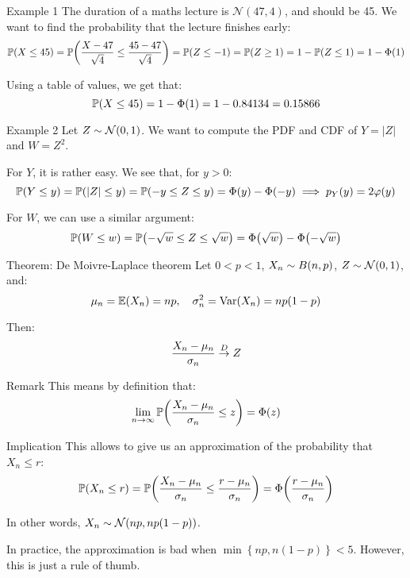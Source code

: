 \documentclass[a4paper]{article}
\begin{document}
\begin{parag}{Example 1}
    The duration of a maths lecture is $\mathcal{N}\left(47, 4\right)$, and should be 45. We want to find the probability that the lecture finishes early: 
    \[\prob\left(X \leq 45\right) = \prob\left(\frac{X - 47}{\sqrt{4}} \leq \frac{45 - 47}{\sqrt{4}}\right) = \prob\left(Z \leq -1\right) = \prob\left(Z \geq 1\right) = 1 - \prob\left(Z \leq 1\right) = 1 - \Phi\left(1\right)\]

    Using a table of values, we get that: 
    \[\prob\left(X \leq 45\right) = 1 - \Phi\left(1\right) = 1 - 0.84134 = 0.15866\]
\end{parag}

\begin{parag}{Example 2}
    Let $Z \followsdistr \mathcal{N}\left(0, 1\right)$. We want to compute the PDF and CDF of $Y = \left|Z\right|$ and $W = Z^2$.

    For $Y$, it is rather easy. We see that, for $y > 0$: 
    \[\prob\left(Y \leq y\right) = \prob\left(\left|Z\right| \leq y\right) = \prob\left(-y \leq Z \leq y \right) = \Phi\left(y\right) - \Phi\left(-y\right) \implies p_Y\left(y\right) = 2 \phi\left(y\right)\]
    
    For $W$, we can use a similar argument: 
    \[\prob\left(W \leq w\right) = \prob\left(-\sqrt{w} \leq Z \leq \sqrt{w}\right) = \Phi\left(\sqrt{w}\right) - \Phi\left(-\sqrt{w}\right)\]
\end{parag}

\begin{parag}{Theorem: De Moivre-Laplace theorem}
    Let $0 < p < 1$, $X_n \followsdistr B\left(n, p\right)$, $Z \followsdistr \mathcal{N}\left(0, 1\right)$, and: 
    \[\mu_n = \exval\left(X_n\right) = np, \mathspace \sigma_n^2 = \Var\left(X_n\right) = np\left(1 - p\right)\]
    
    Then:
    \[\frac{X_n - \mu_n}{\sigma_n} \over{\to}{$D$} Z\]

    \begin{subparag}{Remark}
        This means by definition that:
        \[\lim_{n \to \infty} \prob\left(\frac{X_n - \mu_n}{\sigma_n} \leq z\right) = \Phi\left(z\right)\]
    \end{subparag}

    \begin{subparag}{Implication}
        This allows to give us an approximation of the probability that $X_n \leq r$: 
        \[\prob\left(X_n \leq r\right) = \prob\left(\frac{X_n - \mu_n}{\sigma_n} \leq \frac{r - \mu_n}{\sigma_n}\right) = \Phi\left(\frac{r - \mu_n}{\sigma_n}\right)\]
        
        In other words, $X_n \followsdistr \mathcal{N}\left(np, np\left(1-p\right)\right)$.

        In practice, the approximation is bad when $\min\left\{np, n\left(1-p\right)\right\} < 5$. However, this is just a rule of thumb.
    \end{subparag}
\end{parag}
\end{document}
